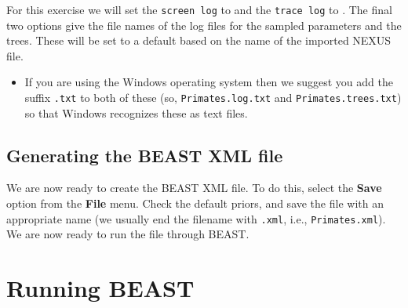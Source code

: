 \documentclass[11pt]{article}
\theoremstyle{plain}%
\theoremstyle{definition}
\theoremstyle{remark}
\begin{document}
For this exercise we will set the \texttt{screen log} to \underline{\screenEvery{}} and the \texttt{trace log} to \underline{\logEvery{}}. The final two
options give the file names of the log files for the sampled parameters and
the trees. These will be set to a default based on the name of the
imported NEXUS file. 

\begin{itemize}
\item If you are using the Windows operating system then we suggest you add the suffix \texttt{.txt} to both of these (so,
\texttt{Primates.log.txt} and \texttt{Primates.trees.txt}) so that Windows recognizes
these as text files. 
\end{itemize}

\subsection{Generating the BEAST XML file }

We are now ready to create the BEAST XML file. To do this,
select the \textbf{Save} option from the \textbf{File} menu. 
Check the default priors, and save the file with an appropriate name
(we usually end the filename with \texttt{.xml}, i.e., \texttt{Primates.xml}).
We are now ready to run the file through BEAST. 

\section{Running BEAST }
\end{document}
